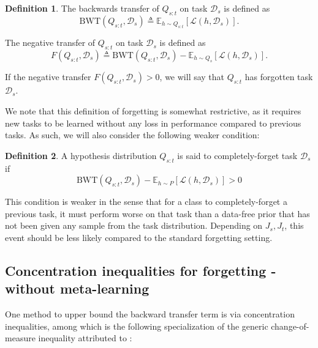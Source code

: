 \documentclass[letterpaper]{article}
\theoremstyle{definition}
\newtheorem{defn}{Definition}[section]
\begin{document}
\begin{defn}
	The backwards transfer of $Q_{s:t}$ on task $\mathcal{D}_s$ is defined as $$\mathrm{BWT}(Q_{s:t}, \mathcal{D}_s) \triangleq \mathbb{E}_{h\sim Q_{s:t}}\left [\mathcal{L}(h, \mathcal{D}_s)\right ].$$
	
	The negative transfer of $Q_{s:t}$ on task $\mathcal{D}_s$ is defined as $$F(Q_{s:t}, \mathcal{D}_s) \triangleq \mathrm{BWT}(Q_{s:t}, \mathcal{D}_s) - \mathbb{E}_{h\sim Q_{s}}\left [\mathcal{L}(h, \mathcal{D}_s)\right ].$$
	
	If the negative transfer $F(Q_{s:t}, \mathcal{D}_s)>0$, we will say that $Q_{s:t}$ has forgotten task $\mathcal{D}_s$.
\end{defn}

We note that this definition of forgetting is somewhat restrictive, as it requires new tasks to be learned without any loss in performance compared to previous tasks. As such, we will also consider the following weaker condition:

\begin{defn}
	A hypothesis distribution $Q_{s:t}$ is said to completely-forget task $\mathcal{D}_s$ if
	$$\mathrm{BWT}(Q_{s:t}, \mathcal{D}_s) - \mathbb{E}_{h\sim P}\left [\mathcal{L}(h, \mathcal{D}_s)\right ]>0$$
\end{defn}

This condition is weaker in the sense that for a class to completely-forget a previous task, it must perform worse on that task than a data-free prior that has not been given any sample from the task distribution. Depending on $J_s,J_t$, this event should be less likely compared to the standard forgetting setting.

\subsection{Concentration inequalities for forgetting - without meta-learning}

One method to upper bound the backward transfer term is via concentration inequalities, among which is the following specialization of the generic change-of-measure inequality attributed to \citet{donsker1975large}:
\end{document}
